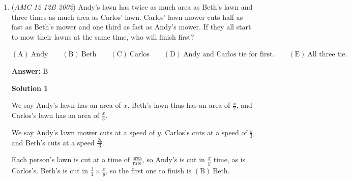 \begin{enumerate}
 



\textbf{Solution 2}

The probability that neither Juan nor Amal rolls a multiple of $3$ is $\frac{6}{8} \cdot \frac{4}{6} = \frac{1}{2}$; using \href{https://artofproblemsolving.com/wiki/index.php?title=Complementary\_counting}{complementary counting}, the probability that at least one does is $1 - \frac 12 = \frac 12 \Rightarrow \mathrm{(C)}$.

 



\textbf{Solution 3 (Alcumus)}

The product will be a multiple of 3 if and only if at least one of the two rolls is a 3 or a 6. The probability that Juan rolls 3 or 6 is $2/8 = 1/4$. The probability that Juan does not roll 3 or 6, but Amal does is $(3/4) (1/3) = 1/4$. Thus, the probability that the product of the rolls is a multiple of 3 is 
 \[\frac{1}{4} + \frac{1}{4} = \boxed{\frac{1}{2}}.\]~aopsav (Credit to AoPS Alcumus)

 


	\item (\textit{AMC 12 12B 2002}) Andy’s lawn has twice as much area as Beth’s lawn and three times as much area as Carlos’ lawn. Carlos’ lawn mower cuts half as fast as Beth’s mower and one third as fast as Andy’s mower. If they all start to mow their lawns at the same time, who will finish first?


 $\mathrm{(A)}\ \text{Andy} \qquad\mathrm{(B)}\ \text{Beth} \qquad\mathrm{(C)}\ \text{Carlos} \qquad\mathrm{(D)}\ \text{Andy\ and \ Carlos\ tie\ for\ first.} \qquad\mathrm{(E)}\ \text{All\ three\ tie.}$

 \textbf{Answer: }B



\textbf{Solution 1}

We say Andy's lawn has an area of $x$. Beth's lawn thus has an area of $\frac{x}{2}$, and Carlos's lawn has an area of $\frac{x}{3}$. 

 We say Andy's lawn mower cuts at a speed of $y$. Carlos's cuts at a speed of $\frac{y}{3}$, and Beth's cuts at a speed $\frac{2y}{3}$.

 Each person's lawn is cut at a time of $\frac{\text{area}}{\text{rate}}$, so Andy's is cut in $\frac{x}{y}$ time, as is Carlos's. Beth's is cut in $\frac{3}{4}\times\frac{x}{y}$, so the first one to finish is $\boxed{\mathrm{(B)}\ \text{Beth}}$.

 




\end{enumerate}
